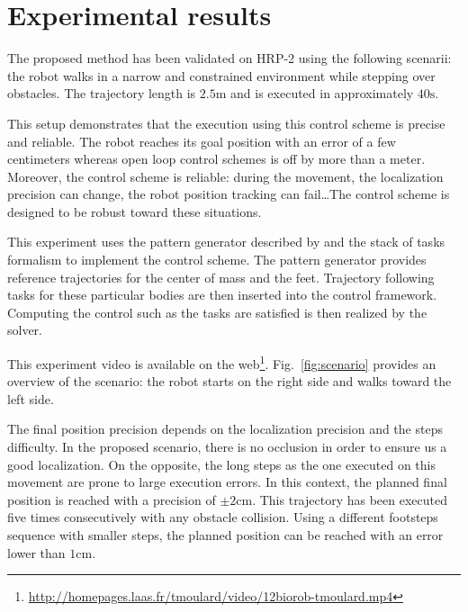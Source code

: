 \section{Experimental results}
\label{exp}


The proposed method has been validated on HRP-2 using the following
scenarii: the robot walks in a narrow and constrained environment
while stepping over obstacles. The trajectory length is
$2.5\mathrm{m}$ and is executed in approximately $40\mathrm{s}$.


This setup demonstrates that the execution using this control scheme
is precise and reliable. The robot reaches its goal position with an
error of a few centimeters whereas open loop control schemes is off by
more than a meter. Moreover, the control scheme is reliable: during
the movement, the localization precision can change, the robot
position tracking can fail\ldots The control scheme is designed to be
robust toward these situations.


This experiment uses the pattern generator described by
\cite{10icra.perrin} and the stack of tasks formalism
\cite{09icar.mansard} to implement the control scheme. The pattern
generator provides reference trajectories for the center of mass and
the feet. Trajectory following tasks for these particular bodies are
then inserted into the control framework. Computing the control such
as the tasks are satisfied is then realized by the solver.


This experiment video is available on the
web\footnote{\mbox{\url{http://homepages.laas.fr/tmoulard/video/12biorob-tmoulard.mp4}}}. Fig.~\ref{fig:scenario}
provides an overview of the scenario: the robot starts on the right
side and walks toward the left side.


The final position precision depends on the localization precision and
the steps difficulty. In the proposed scenario, there is no occlusion
in order to ensure us a good localization. On the opposite, the long
steps as the one executed on this movement are prone to large
execution errors. In this context, the planned final position is
reached with a precision of $\pm 2 \mathrm{cm}$. This trajectory has
been executed five times consecutively with any obstacle collision.
Using a different footsteps sequence with smaller steps, the planned
position can be reached with an error lower than $1 \mathrm{cm}$.


